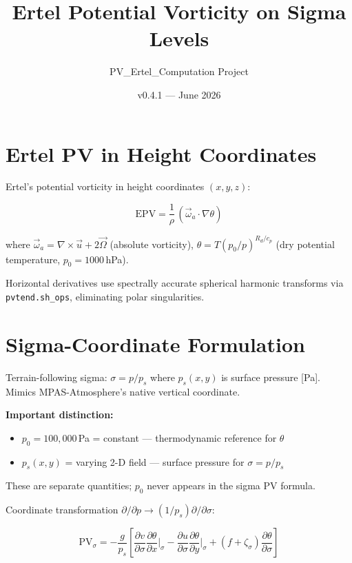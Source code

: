 \documentclass[11pt,a4paper]{article}
\title{Ertel Potential Vorticity on Sigma Levels}
\author{PV\_Ertel\_Computation Project}
\date{v0.4.1 --- June 2026}
\begin{document}
\maketitle

\section{Ertel PV in Height Coordinates}

Ertel's potential vorticity \citep{ertel1942} in height coordinates $(x,y,z)$:

\begin{equation}\label{eq:epv_z}
\mathrm{EPV} = \frac{1}{\rho}\,(\vec{\omega}_a \cdot \nabla\theta)
\end{equation}

where $\vec{\omega}_a = \nabla \times \vec{u} + 2\vec{\Omega}$ (absolute
vorticity), $\theta = T(p_0/p)^{R_d/c_p}$ (dry potential temperature,
$p_0 = 1000$\,hPa).

Horizontal derivatives use spectrally accurate spherical harmonic transforms
via \texttt{pvtend.sh\_ops}, eliminating polar singularities.

\section{Sigma-Coordinate Formulation}\label{sec:sigma}

Terrain-following sigma: $\sigma = p/p_s$ where $p_s(x,y)$ is surface
pressure [Pa].  Mimics MPAS-Atmosphere's native vertical coordinate.

\textbf{Important distinction:}
\begin{itemize}
  \item $p_0 = 100{,}000$\,Pa = constant --- thermodynamic reference for $\theta$
  \item $p_s(x,y)$ = varying 2-D field --- surface pressure for $\sigma = p/p_s$
\end{itemize}

These are separate quantities; $p_0$ never appears in the sigma PV formula.

Coordinate transformation $\partial/\partial p \to (1/p_s)\partial/\partial\sigma$:

\begin{equation}\label{eq:epv_sigma}
\boxed{\mathrm{PV}_\sigma = -\frac{g}{p_s}\left[
  \frac{\partial v}{\partial\sigma}\frac{\partial\theta}{\partial x}\Big|_\sigma
  - \frac{\partial u}{\partial\sigma}\frac{\partial\theta}{\partial y}\Big|_\sigma
  + (f + \zeta_\sigma)\frac{\partial\theta}{\partial\sigma}
\right]}
\end{equation}
\end{document}
